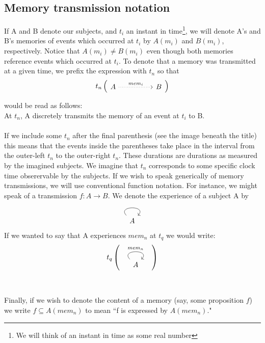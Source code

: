 \documentclass{article}
\begin{document}
\subsection*{Memory transmission notation}
If A and B denote our subjects, and $t_i$ an instant in time\footnote{We will think of an instant in time as some real number}, we will denote A's and B's memories of events which occurred at $t_i$ by $A(m_i)$ and $B(m_i)$, respectively. Notice that $A(m_i) \neq B(m_i)$ even though both memories reference events which occurred at $t_i$. To denote that a memory was transmitted at a given time, we prefix the expression with $t_n$ so that \\ 

\[
t_n
\begin{pmatrix}
\begin{tikzcd}
    A && B 
    \arrow["{mem_i}", dotted, from=1-1, to=1-3]
\end{tikzcd}
\end{pmatrix}
\]


\noindent would be read as follows: \\

At $t_n$, A discretely transmits the memory of an event at $t_i$ to B. \\\\
If we include some $t_n$ after the final parenthesis (see the image beneath the title) this means that the events inside the parentheses take place in the interval from the outer-left $t_n$ to the outer-right $t_n$. These durations are durations as measured by the imagined subjects. We imagine that $t_n$ corresponds to some specific clock time obserervable by the subjects. If we wish to speak generically of memory transmissions, we will use conventional function notation. For instance, we might speak of a transmission $f: A \rightarrow B$. We denote the experience of a subject A by 
\[
\begin{tikzcd}
    A \arrow[loop, distance=2em, "" , out=135, in=45] {}
\end{tikzcd}
\]
If we wanted to say that A experiences $mem_n$ at $t_q$ we would write: \\
\[
t_q
\begin{pmatrix}
\begin{tikzcd}
    A \arrow[loop, distance=2em, "{mem_n}" , out=135, in=45] {}
\end{tikzcd}
\end{pmatrix}
\]
\\\\
Finally, if we wish to denote the content of a memory (say, some proposition $f$) we write $f \subseteq A(mem_n)$ to mean ``f is expressed by $A(mem_n)$."
\end{document}
